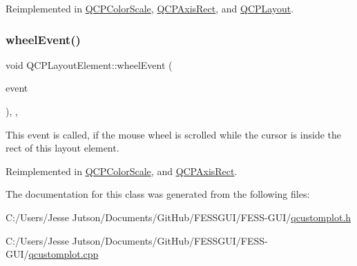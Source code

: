 Reimplemented in \hyperlink{class_q_c_p_color_scale_ab8f6991ac88243fc582b44b183670334}{Q\+C\+P\+Color\+Scale}, \hyperlink{class_q_c_p_axis_rect_a255080a017df9083a60a321ef2ba9ed8}{Q\+C\+P\+Axis\+Rect}, and \hyperlink{class_q_c_p_layout_a34ab477e820537ded7bade4399c482fd}{Q\+C\+P\+Layout}.

\hypertarget{class_q_c_p_layout_element_a300521d2fd18a893c1b85f6be11ce2bf}{}\label{class_q_c_p_layout_element_a300521d2fd18a893c1b85f6be11ce2bf} 
\subsubsection{\texorpdfstring{wheel\+Event()}{wheelEvent()}}
{\footnotesize\ttfamily void Q\+C\+P\+Layout\+Element\+::wheel\+Event (\begin{DoxyParamCaption}\item[{Q\+Wheel\+Event $\ast$}]{event }\end{DoxyParamCaption})\hspace{0.3cm}{\ttfamily [inline]}, {\ttfamily [protected]}, {\ttfamily [virtual]}}

This event is called, if the mouse wheel is scrolled while the cursor is inside the rect of this layout element. 

Reimplemented in \hyperlink{class_q_c_p_color_scale_ab398e14c01240f3dc855884fe9e1ee8c}{Q\+C\+P\+Color\+Scale}, and \hyperlink{class_q_c_p_axis_rect_a5acf41fc30aa68ea263246ecfad85c31}{Q\+C\+P\+Axis\+Rect}.



The documentation for this class was generated from the following files\+:\begin{DoxyCompactItemize}
\item 
C\+:/\+Users/\+Jesse Jutson/\+Documents/\+Git\+Hub/\+F\+E\+S\+S\+G\+U\+I/\+F\+E\+S\+S-\/\+G\+U\+I/\hyperlink{qcustomplot_8h}{qcustomplot.\+h}\item 
C\+:/\+Users/\+Jesse Jutson/\+Documents/\+Git\+Hub/\+F\+E\+S\+S\+G\+U\+I/\+F\+E\+S\+S-\/\+G\+U\+I/\hyperlink{qcustomplot_8cpp}{qcustomplot.\+cpp}\end{DoxyCompactItemize}
